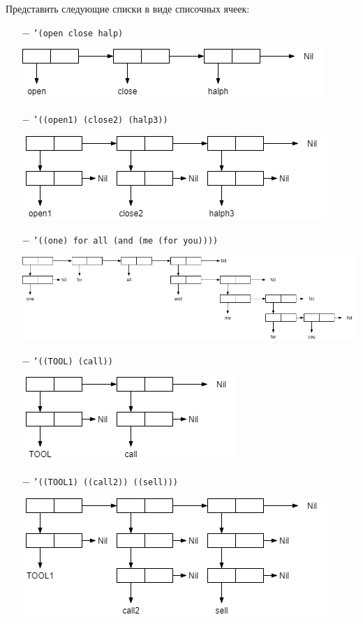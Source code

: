 Представить следующие списки в виде списочных ячеек:
\begin{enumerate}[topsep=0pt]
	\item[$-$] {\texttt{'(open close halp)}}

	\includegraphics[scale=1]{img/1.1}

	\item[$-$] {\texttt{'((open1) (close2) (halp3))}}

	\includegraphics[scale=1]{img/1.2}

	\item[$-$] {\texttt{'((one) for all (and (me (for you))))}}

	\includegraphics[scale=0.5]{img/1.3}
	\clearpage
	\item[$-$] {\texttt{'((TOOL) (call))}}
	
	\includegraphics[scale=0.8]{img/1.4}

	\item[$-$] {\texttt{'((TOOL1) ((call2)) ((sell)))}}

	\includegraphics[scale=0.8]{img/1.5}


\end{enumerate}
